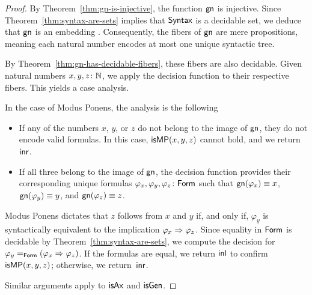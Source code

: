 \begin{proof}
    By Theorem~\ref{thm:gn-is-injective}, the function $\mathsf{gn}$ is injective. Since Theorem~\ref{thm:syntax-are-sets} implies that $\mathsf{Syntax}$ is a decidable set, we deduce that $\mathsf{gn}$ is an embedding \citep[Chapter~4]{caniglia2025hott}. Consequently, the fibers of $\mathsf{gn}$ are mere propositions, meaning each natural number encodes at most one unique syntactic tree.

    By Theorem~\ref{thm:gn-has-decidable-fibers}, these fibers are also decidable. Given natural numbers $x,y,z\colon\N$, we apply the decision function to their respective fibers. This yields a case analysis.

    In the case of Modus Ponens, the analysis is the following
    \begin{itemize}
        \item If any of the numbers $x$, $y$, or $z$ do not belong to the image of $\mathsf{gn}$, they do not encode valid formulas. In this case, $\mathsf{isMP}(x,y,z)$ cannot hold, and we return $\mathsf{inr}$.
        \item If all three belong to the image of $\mathsf{gn}$, the decision function provides their corresponding unique formulas $\varphi_x, \varphi_y, \varphi_z\colon\fun{Form}$ such that $\mathsf{gn}(\varphi_x)\equiv x$, $\mathsf{gn}(\varphi_y)\equiv y$, and $\mathsf{gn}(\varphi_z)\equiv z$.
    \end{itemize}
    Modus Ponens dictates that $z$ follows from $x$ and $y$ if, and only if, $\varphi_y$ is syntactically equivalent to the implication $\varphi_x\mathrel{\Rightarrow}\varphi_z$. Since equality in $\mathsf{Form}$ is decidable by Theorem~\ref{thm:syntax-are-sets}, we compute the decision for $\varphi_y\mathrel{=_{\mathsf{Form}}}(\varphi_x\mathrel{\Rightarrow}\varphi_z)$. If the formulas are equal, we return $\mathsf{inl}$ to confirm $\mathsf{isMP}(x,y,z)$; otherwise, we return~$\mathsf{inr}$.

    Similar arguments apply to $\mathsf{isAx}$ and $\mathsf{isGen}$.
\end{proof}



